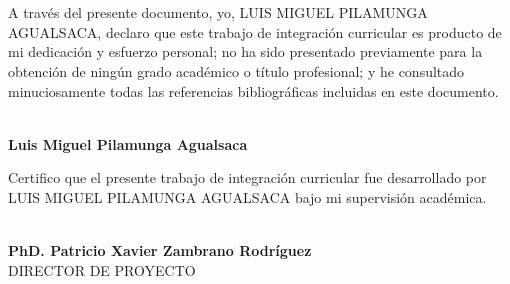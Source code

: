 \newpage
\chapter*{}
A través del presente documento, yo, LUIS MIGUEL PILAMUNGA AGUALSACA, declaro que este trabajo de integración curricular es producto de mi dedicación y esfuerzo personal; no ha sido presentado previamente para la obtención de ningún grado académico o título profesional; y he consultado minuciosamente todas las referencias bibliográficas incluidas en este documento.
\vspace{2.0cm}
\begin{center}
\makebox[2.1in]{\hrulefill}\\
{\bfseries Luis Miguel Pilamunga Agualsaca}\\
\end{center}
\vspace{2.0cm}
Certifico que el presente trabajo de integración curricular fue desarrollado por LUIS MIGUEL PILAMUNGA AGUALSACA bajo mi supervisión académica.
\vspace{2.0cm}
\begin{flushright}
\makebox[2.1in]{\hrulefill}\\
{\bfseries PhD. Patricio Xavier Zambrano Rodríguez}\\
DIRECTOR DE PROYECTO
\end{flushright}